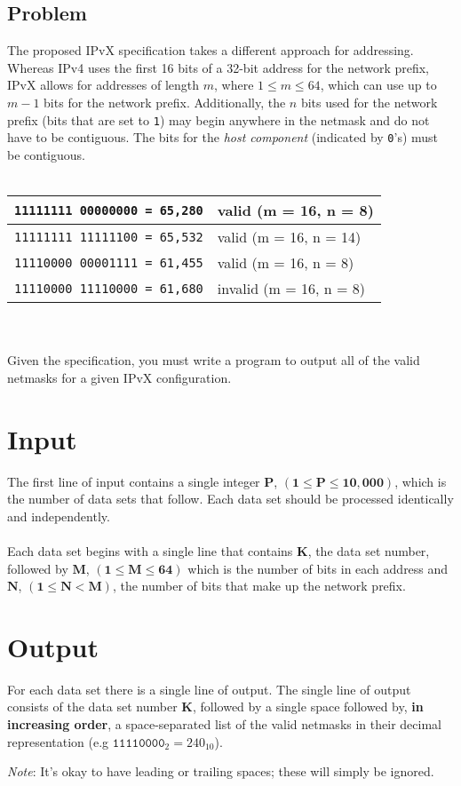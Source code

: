 \documentclass[11pt]{article}
\begin{document}
\subsection{Problem}
The proposed IPvX specification takes a different approach for addressing. Whereas IPv4 uses the first 16 bits of a 32-bit address for the network prefix, IPvX allows for addresses of length $m$, where $1 \le m \le 64$, which can use up to $m-1$ bits for the network prefix. Additionally, the $n$ bits used for the network prefix (bits that are set to \texttt{1}) may begin anywhere in the netmask and do not have to be contiguous. The bits for the \emph{host component} (indicated by \texttt{0}'s) must be contiguous.
\\\\ 
\begin{tabularx}{\textwidth}{|X|X|}
	\hline
	\texttt{11111111 00000000 = 65,280} & valid (m = 16, n = 8)\\ \hline
	\texttt{11111111 11111100 = 65,532} & valid (m = 16, n = 14)\\ \hline
	\texttt{11110000 00001111 = 61,455} & valid (m = 16, n = 8)\\ \hline
	\texttt{11110000 11110000 = 61,680} & invalid (m = 16, n = 8)\\ \hline
\end{tabularx}
\\\\
Given the specification, you must write a program to output all of the valid netmasks for a given IPvX configuration.

\section{Input}
The first line of input contains a single integer $\boldsymbol{P}$, $(\boldsymbol{1} \le \boldsymbol{P} \le \boldsymbol{10,000})$, which is the number of data sets that follow. Each
data set should be processed identically and independently.
\\\\
Each data set begins with a single line that contains $\boldsymbol{K}$, the data
set number, followed by $\boldsymbol{M}$, $(\boldsymbol{1} \le \boldsymbol{M} \le \boldsymbol{64})$
which is the number of bits in each address and  $\boldsymbol{N}$,
$(\boldsymbol{1} \le \boldsymbol{N} < \boldsymbol{M})$, the number of bits that make up the network prefix.

\section{Output}
For each data set there is a single line of output. The single line of output
consists of the data set number $\boldsymbol{K}$, followed by a single space
followed by, \textbf{in increasing order}, a space-separated list of the valid netmasks
in their decimal representation (e.g $\texttt{11110000}_2 = 240_{10}$).
\begin{center}\emph{Note}: It's okay to have leading or trailing spaces; these will simply be ignored.\end{center}
\end{document}
